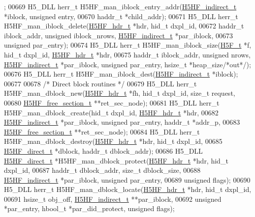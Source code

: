 \begin{DoxyCode}
      ;
00669 H5\_DLL herr\_t H5HF\_man\_iblock\_entry\_addr(\hyperlink{struct_h5_h_f__indirect__t}{H5HF\_indirect\_t} *iblock, \textcolor{keywordtype}{unsigned} entry,
00670     haddr\_t *child\_addr);
00671 H5\_DLL herr\_t H5HF\_man\_iblock\_delete(\hyperlink{struct_h5_h_f__hdr__t}{H5HF\_hdr\_t} *hdr, hid\_t dxpl\_id,
00672     haddr\_t iblock\_addr, \textcolor{keywordtype}{unsigned} iblock\_nrows, \hyperlink{struct_h5_h_f__indirect__t}{H5HF\_indirect\_t} *par\_iblock,
00673     \textcolor{keywordtype}{unsigned} par\_entry);
00674 H5\_DLL herr\_t H5HF\_man\_iblock\_size(\hyperlink{struct_h5_f__t}{H5F\_t} *f, hid\_t dxpl\_id, \hyperlink{struct_h5_h_f__hdr__t}{H5HF\_hdr\_t} *hdr,
00675     haddr\_t iblock\_addr, \textcolor{keywordtype}{unsigned} nrows, \hyperlink{struct_h5_h_f__indirect__t}{H5HF\_indirect\_t} *par\_iblock, \textcolor{keywordtype}{unsigned} par\_entry, 
      hsize\_t *heap\_size\textcolor{comment}{/*out*/});
00676 H5\_DLL herr\_t H5HF\_man\_iblock\_dest(\hyperlink{struct_h5_h_f__indirect__t}{H5HF\_indirect\_t} *iblock);
00677 
00678 \textcolor{comment}{/* Direct block routines */}
00679 H5\_DLL herr\_t H5HF\_man\_dblock\_new(\hyperlink{struct_h5_h_f__hdr__t}{H5HF\_hdr\_t} *fh, hid\_t dxpl\_id, \textcolor{keywordtype}{size\_t} request,
00680     \hyperlink{struct_h5_h_f__free__section__t}{H5HF\_free\_section\_t} **ret\_sec\_node);
00681 H5\_DLL herr\_t H5HF\_man\_dblock\_create(hid\_t dxpl\_id, \hyperlink{struct_h5_h_f__hdr__t}{H5HF\_hdr\_t} *hdr,
00682     \hyperlink{struct_h5_h_f__indirect__t}{H5HF\_indirect\_t} *par\_iblock, \textcolor{keywordtype}{unsigned} par\_entry, haddr\_t *addr\_p,
00683     \hyperlink{struct_h5_h_f__free__section__t}{H5HF\_free\_section\_t} **ret\_sec\_node);
00684 H5\_DLL herr\_t H5HF\_man\_dblock\_destroy(\hyperlink{struct_h5_h_f__hdr__t}{H5HF\_hdr\_t} *hdr, hid\_t dxpl\_id,
00685     \hyperlink{struct_h5_h_f__direct__t}{H5HF\_direct\_t} *dblock, haddr\_t dblock\_addr);
00686 H5\_DLL \hyperlink{struct_h5_h_f__direct__t}{H5HF\_direct\_t} *H5HF\_man\_dblock\_protect(\hyperlink{struct_h5_h_f__hdr__t}{H5HF\_hdr\_t} *hdr, hid\_t dxpl\_id,
00687     haddr\_t dblock\_addr, \textcolor{keywordtype}{size\_t} dblock\_size,
00688     \hyperlink{struct_h5_h_f__indirect__t}{H5HF\_indirect\_t} *par\_iblock, \textcolor{keywordtype}{unsigned} par\_entry,
00689     \textcolor{keywordtype}{unsigned} flags);
00690 H5\_DLL herr\_t H5HF\_man\_dblock\_locate(\hyperlink{struct_h5_h_f__hdr__t}{H5HF\_hdr\_t} *hdr, hid\_t dxpl\_id,
00691     hsize\_t obj\_off, \hyperlink{struct_h5_h_f__indirect__t}{H5HF\_indirect\_t} **par\_iblock,
00692     \textcolor{keywordtype}{unsigned} *par\_entry, hbool\_t *par\_did\_protect, \textcolor{keywordtype}{unsigned} flags);

\end{DoxyCode}
